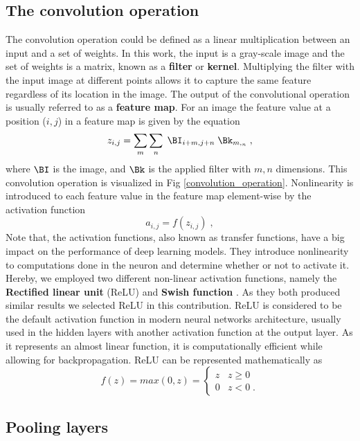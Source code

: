 \documentclass[final,3p,times]{elsarticle}
\begin{document}
\subsection{The convolution operation}
The convolution operation could be defined as a linear multiplication between an input and a set of weights. In this work, the input is a gray-scale image and the set of weights is a matrix, known as a \textbf{filter} or \textbf{kernel}. Multiplying the filter with the input image at different points allows it to capture the same feature regardless of its location in the image. The output of the convolutional operation is usually referred to as a \textbf{feature map}. For an image the feature value at a position ($i,j$) in a feature map is given by the equation
\begin{equation}
z_{i,j} = \sum_m\sum_n \; \BI_{i+m,j+n} \; \Bk_{m,_n}\; ,
\end{equation}
where $\BI$ is the image, and $\Bk$ is the applied filter with $m,n$ dimensions. This convolution operation is visualized in Fig \ref{convolution_operation}.
%
Nonlinearity is introduced to each feature value in the feature map element-wise by the activation function
\begin{equation}
a_{i,j} = f(z_{i,j}) \; ,
\end{equation}
Note that, the activation functions, also known as transfer functions, have a big impact on the performance of deep learning models. They introduce nonlinearity to computations done in the neuron and determine whether or not to activate it. Hereby, we employed two different non-linear activation functions, namely the \textbf{Rectified linear unit} (ReLU) \citet{nair2010} and \textbf{Swish function} \citet{eger2019time}. As they both produced similar results we selected ReLU in this contribution. ReLU is considered to be the default activation function in modern neural networks architecture, usually used in the hidden layers with another activation function at the output layer. As it represents an almost linear function, it is computationally efficient while allowing for backpropagation. ReLU can be represented mathematically as  
\begin{equation}
f(z) = max(0,z) =
\begin{cases}
z   &   z \ge 0 \\[2mm]
0 & z < 0 \; . 
\end{cases}
\end{equation}



\subsection{Pooling layers}
\end{document}
